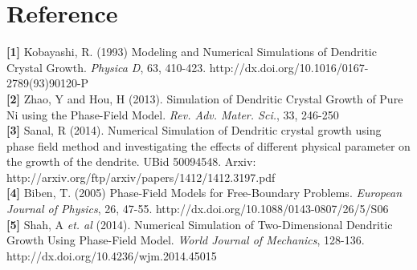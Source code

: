 \documentclass[10pt]{article} %
\begin{document}
\section{Reference}
\textbf{[1]} Kobayashi, R. (1993) Modeling and Numerical Simulations of Dendritic Crystal Growth. \textit{Physica D}, 63, 410-423. http://dx.doi.org/10.1016/0167-2789(93)90120-P\\
\textbf{[2]} Zhao, Y and Hou, H (2013). Simulation of Dendritic Crystal Growth of Pure Ni using the Phase-Field Model. \textit{Rev. Adv. Mater. Sci.}, 33, 246-250\\
\textbf{[3]} Sanal, R (2014). Numerical Simulation of Dendritic crystal growth using phase field method and investigating the effects of different physical parameter on the growth of the dendrite. UBid 50094548. Arxiv: http://arxiv.org/ftp/arxiv/papers/1412/1412.3197.pdf\\
\textbf{[4]} Biben, T. (2005) Phase-Field Models for Free-Boundary Problems. \textit{European Journal of Physics}, 26, 47-55. http://dx.doi.org/10.1088/0143-0807/26/5/S06\\
\textbf{[5]} Shah, A \textit{et. al} (2014). Numerical Simulation of Two-Dimensional Dendritic Growth Using Phase-Field Model. \textit{World Journal of Mechanics}, 128-136. http://dx.doi.org/10.4236/wjm.2014.45015
\end{document}
